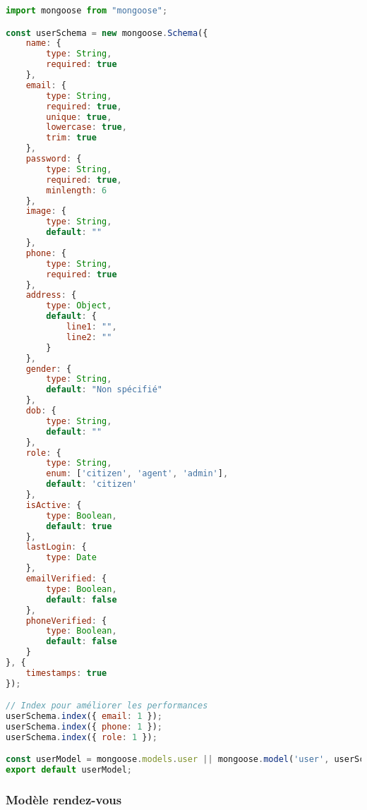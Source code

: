 \begin{lstlisting}[language=JavaScript, caption=userModel.js]
import mongoose from "mongoose";

const userSchema = new mongoose.Schema({
    name: { 
        type: String, 
        required: true 
    },
    email: { 
        type: String, 
        required: true, 
        unique: true,
        lowercase: true,
        trim: true
    },
    password: { 
        type: String, 
        required: true,
        minlength: 6
    },
    image: { 
        type: String, 
        default: "" 
    },
    phone: { 
        type: String, 
        required: true 
    },
    address: { 
        type: Object, 
        default: { 
            line1: "", 
            line2: "" 
        } 
    },
    gender: { 
        type: String, 
        default: "Non spécifié" 
    },
    dob: { 
        type: String, 
        default: "" 
    },
    role: {
        type: String,
        enum: ['citizen', 'agent', 'admin'],
        default: 'citizen'
    },
    isActive: {
        type: Boolean,
        default: true
    },
    lastLogin: {
        type: Date
    },
    emailVerified: {
        type: Boolean,
        default: false
    },
    phoneVerified: {
        type: Boolean,
        default: false
    }
}, { 
    timestamps: true 
});

// Index pour améliorer les performances
userSchema.index({ email: 1 });
userSchema.index({ phone: 1 });
userSchema.index({ role: 1 });

const userModel = mongoose.models.user || mongoose.model('user', userSchema);
export default userModel;
\end{lstlisting}

\subsubsection{Modèle rendez-vous}

